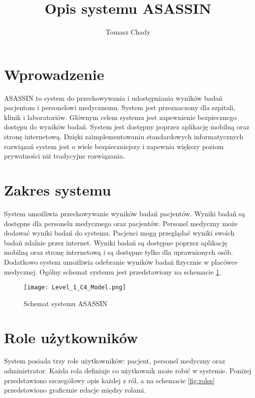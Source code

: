 \documentclass{documentation}
\title{Opis systemu ASASSIN}
\author{Tomasz Chady}
\begin{document}
\maketitle

\section{Wprowadzenie}

ASASSIN to system do przechowywania i udostępniania wyników badań pacjentom i personelowi medycznemu.
System jest przeznaczony dla szpitali, klinik i laboratoriów.
Głównym celem systemu jest zapewnienie bezpiecznego dostępu do wyników badań.
System jest dostępny poprzez aplikację mobilną oraz stronę internetową.
Dzięki zaimplementowaniu standardowych informatycznych rozwiązań system jest o wiele bezpieczniejszy i zapewnia większy poziom prywatności niż tradycyjne rozwiązania.

\section{Zakres systemu}

System umożliwia przechowywanie wyników badań pacjentów.
Wyniki badań są dostępne dla personelu medycznego oraz pacjentów.
Personel medyczny może dodawać wyniki badań do systemu.
Pacjenci mogą przeglądać wyniki swoich badań zdalnie przez internet.
Wyniki badań są dostępne poprzez aplikację mobilną oraz stronę internetową i są dostępne tylko dla uprawnionych osób.
Dodatkowo system umożliwia odebranie wyników badań fizycznie w placówce medycznej.
Ogólny schemat systemu jest przedstawiony na schemacie \ref{fig:system}.

\begin{figure}[h]
    \centering
    \texttt{[image: Level\_1\_C4\_Model.png]}
    \caption{Schemat systemu ASASSIN\label{fig:system}}
\end{figure}

\section{Role użytkowników}

System posiada trzy role użytkowników: pacjent, personel medyczny oraz administrator.
Każda rola definiuje co użytkownik może robić w systemie.
Poniżej przedstawiono szczegółowy opis każdej z ról, a na schemacie \ref{fig:roles} przedstawiono graficznie relacje między rolami.
\end{document}
